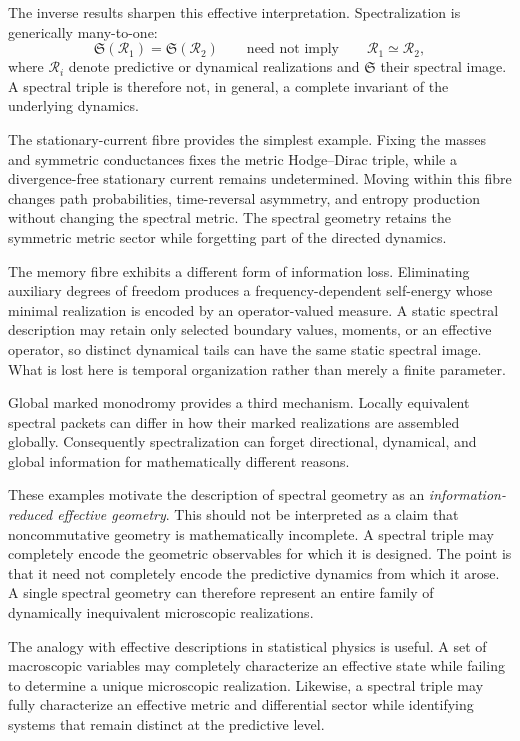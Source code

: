\documentclass[11pt]{article}
\theoremstyle{definition}
\theoremstyle{remark}
\theoremstyle{definition}
\theoremstyle{remark}
\begin{document}
The inverse results sharpen this effective interpretation.  Spectralization is
generically many-to-one:
\begin{equation}
\mathfrak S(\mathcal R_1)=\mathfrak S(\mathcal R_2)
\qquad\text{need not imply}\qquad
\mathcal R_1\simeq\mathcal R_2,
\label{eq:discussion-nonfaithful}
\end{equation}
where $\mathcal R_i$ denote predictive or dynamical realizations and
$\mathfrak S$ their spectral image.  A spectral triple is therefore not, in
general, a complete invariant of the underlying dynamics.

The stationary-current fibre provides the simplest example.  Fixing the masses
and symmetric conductances fixes the metric Hodge--Dirac triple, while a
divergence-free stationary current remains undetermined.  Moving within this
fibre changes path probabilities, time-reversal asymmetry, and entropy production
without changing the spectral metric.  The spectral geometry retains the
symmetric metric sector while forgetting part of the directed dynamics.

The memory fibre exhibits a different form of information loss.  Eliminating
auxiliary degrees of freedom produces a frequency-dependent self-energy whose
minimal realization is encoded by an operator-valued measure.  A static spectral
description may retain only selected boundary values, moments, or an effective
operator, so distinct dynamical tails can have the same static spectral image.
What is lost here is temporal organization rather than merely a finite parameter.

Global marked monodromy provides a third mechanism.  Locally equivalent spectral
packets can differ in how their marked realizations are assembled globally.
Consequently spectralization can forget directional, dynamical, and global
information for mathematically different reasons.

These examples motivate the description of spectral geometry as an
\emph{information-reduced effective geometry}.  This should not be interpreted as
a claim that noncommutative geometry is mathematically incomplete.  A spectral
triple may completely encode the geometric observables for which it is designed.
The point is that it need not completely encode the predictive dynamics from which
it arose.  A single spectral geometry can therefore represent an entire family of
dynamically inequivalent microscopic realizations.

The analogy with effective descriptions in statistical physics is useful.  A set
of macroscopic variables may completely characterize an effective state while
failing to determine a unique microscopic realization.  Likewise, a spectral
triple may fully characterize an effective metric and differential sector while
identifying systems that remain distinct at the predictive level.
\end{document}
